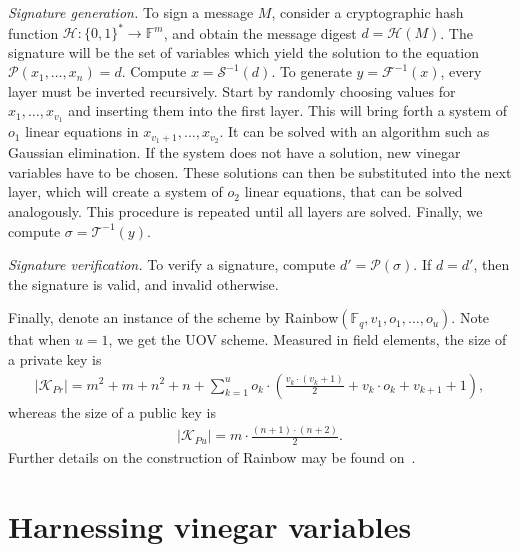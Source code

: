 \documentclass[openright]{report}
\begin{document}
\emph{Signature generation.}
To sign a message $M$, consider a cryptographic hash function
$\mathcal{H} : {\{0, 1\}}^{*} \longrightarrow \mathbb{F}^{m}$, and obtain the
message digest $d = \mathcal{H}(M)$. The signature will be the set of variables
which yield the solution to the equation
$\mathcal{P}(x_{1}, \dots, x_{n}) = d$. Compute $x = \mathcal{S}^{-1}(d)$. To
generate $y = \mathcal{F}^{-1}(x)$, every layer must be inverted recursively.
Start by randomly choosing values for $x_{1}, \dots, x_{v_{1}}$ and inserting
them into the first layer. This will bring forth a system of $o_{1}$ linear
equations in $x_{v_{1} + 1}, \dots, x_{v_{2}}$. It can be solved with an
algorithm such as Gaussian elimination. If the system does not have a solution,
new vinegar variables have to be chosen. These solutions can then be
substituted into the next layer, which will create a system of $o_{2}$ linear
equations, that can be solved analogously. This procedure is repeated until all
layers are solved. Finally, we compute $\sigma = \mathcal{T}^{-1}(y)$.

\emph{Signature verification.}
To verify a signature, compute $d' = \mathcal{P}(\sigma)$. If $d = d'$, then
the signature is valid, and invalid otherwise.

Finally, denote an instance of the scheme by
Rainbow$(\mathbb{F}_{q}, v_{1}, o_{1}, \dots, o_{u})$. Note that when $u = 1$,
we get the UOV scheme. Measured in field elements, the size of a private key is
\begin{align}
  |\mathcal{K}_{Pr}| = m^{2} + m + n^{2} + n
    + \sum_{k = 1}^{u} o_{k} \cdot \left( \frac{v_{k} \cdot (v_{k} + 1)}{2}
      + v_{k} \cdot o_{k} + v_{k + 1} + 1 \right),
\end{align}
whereas the size of a public key is
\begin{align}
  |\mathcal{K}_{Pu}| = m \cdot \frac{(n + 1) \cdot (n + 2)}{2}.
\end{align}
Further details on the construction of Rainbow may be found
on~\cite[Section 3.3]{Ding:2006:book}.


\chapter{Harnessing vinegar variables}
\end{document}
